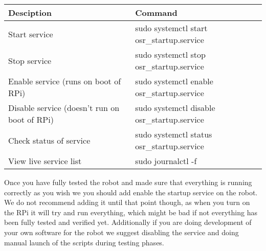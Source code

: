 \documentclass[12pt]{article}
\begin{document}
\begin{table}[H]
	\centering
		\begin{tabular}{| l | l |}
		\hline
		\textbf{Desciption} & \textbf{Command} \\ \hline
		Start service & sudo systemctl start osr\_startup.service \\ \hline
		Stop service & sudo systemctl stop osr\_startup.service \\ \hline
		Enable service (runs on boot of RPi) & sudo systemctl enable osr\_startup.service \\ \hline
		Disable service (doesn't run on boot of RPi) & sudo systemctl disable osr\_startup.service \\ \hline
		Check status of service & sudo systemctl status osr\_startup.service \\ \hline
		View live service list & sudo journalctl -f \\ \hline
		\end{tabular}
\end{table}

Once you have fully tested the robot and made sure that everything is running correctly as you wish we you should add enable the startup service on the robot. We do not recommend adding it until that point though, as when you turn on the RPi it will try and run everything, which might be bad if not everything has been fully tested and verified yet. Additionally if you are doing development of your own software for the robot we suggest disabling the service and doing manual launch of the scripts during testing phases. 
\end{document}
